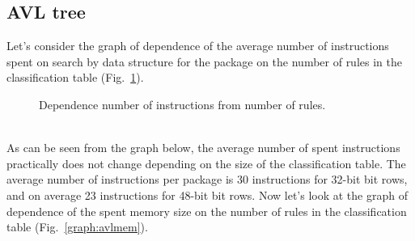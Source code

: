 \documentclass[conference]{IEEEtran}
\begin{document}
        \subsection{AVL tree}
            Let's consider the graph of dependence of the average number of instructions 
            spent on search by data structure for the package on the number of rules 
            in the classification table (Fig.~\ref{graph:avlinst}).
            \begin{figure}[ht]
                \centering
                \captionsetup{justification=centering}
                \caption{Dependence number of instructions from number of rules.}
                \label{graph:avlinst}
            \end{figure}
            \\
            As can be seen from the graph below, the average number of spent instructions 
            practically does not change depending on the size of the classification table. 
            The average number of instructions per package is 30 instructions for 32-bit bit rows, 
            and on average 23 instructions for 48-bit bit rows.
            Now let's look at the graph of dependence of the spent memory size on 
            the number of rules in the classification table (Fig.~\ref{graph:avlmem}).
            \\
\end{document}
